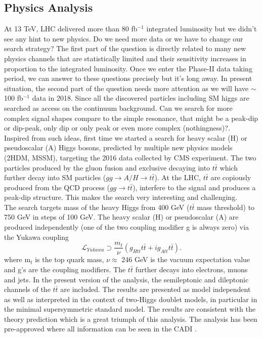 \documentclass[12pt]{article}
\begin{document}
\subsection*{Physics Analysis}
At 13 TeV, LHC delivered more than 80 fb$^{-1}$ integrated luminosity but we didn't see any hint to new physics. Do we need more data or we have to change our search strategy? The first part of the question is directly related to many new physics channels that are statistically limited and their sensitivity increases in proportion to the integrated luminosity. Once we enter the Phase-II data taking period, we can answer to these questions precisely but it's long away. In present situation, the second part of the question needs more attention as we will have $\sim$100 fb$^{-1}$ data in 2018. Since all the discovered particles including SM higgs are searched as access on the continuum background. Can we search for more complex signal shapes compare to the simple resonance, that might be a peak-dip or dip-peak, only dip or only peak or even more complex (nothingness)?.\\
Inspired from such ideas, first time we started a search for heavy scalar (H) or pseudoscalar (A) Higgs bosons, predicted by multiple new physics models (2HDM, MSSM), targeting the 2016 data collected by CMS experiment. The two particles produced by the gluon fusion and exclusive decaying into $t\bar t$ which further decay into SM particles ($gg\rightarrow A/H\rightarrow t\bar t$). At the LHC, $t\bar t$ are copiously produced from the QCD process ($gg\rightarrow t\bar t$), interfere to the signal and produces a peak-dip structure. This makes the search very interesting and challenging.\\
The search targets mass of the heavy Higgs from 400 GeV ($t\bar t$ mass threshold) to 750 GeV in steps of 100 GeV. The heavy scalar (H) or pseudoscalar (A) are produced independently (one of the two coupling modifier g is always zero) via the Yukawa coupling 
\begin{equation}
\mathcal{L}_{Yukawa} \supset \frac{m_{t}}{\nu}(g_{Htt} t\bar t + ig_{Att}t \bar t).
\end{equation}      
where m$_{t}$ is the top quark mass, $\nu\approx$ 246 GeV is the vacuum expectation value and g's are the coupling modifiers. The $t\bar t$ further decays into electrons, muons and jets. In the present version of the analysis, the semileptonic and dileptonic channels of the $t\bar t$ are included. The results are presented as model independent as well as interpreted in the context of two-Higgs doublet models, in particular in the minimal supersymmetric standard model. The results are consistent with the theory prediction which is a great triumph of this analysis. The analysis has been pre-approved where all information can be seen in the \textsc{CADI} \cite{first1}.\\
\end{document}
